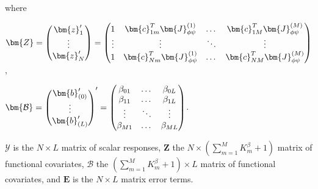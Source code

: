 where
\begin{center}
$ \bm{Z}=\def\arraystretch{1} \begin{pmatrix}
\bm{z}'_1 \\
\vdots\\
\bm{z}'_N
\end{pmatrix} = \def\arraystretch{1}
\begin{pmatrix}
1 & \bm{c}_{1 m}^T \bm{J}_{\phi \psi}^{(1)} & \dots & \bm{c}_{1 M}^T \bm{J}_{\phi \psi}^{(M)} \\
\vdots & \vdots & \ddots & \vdots \\
1 & \bm{c}_{N m}^T \bm{J}_{\phi \psi}^{(1)} & \dots & \bm{c}_{N M}^T \bm{J}_{\phi \psi}^{(M)}  
\end{pmatrix}$,
\end{center}

\begin{center}
$ \bm{\mathcal{B}}=\def\arraystretch{1} \begin{pmatrix}
\bm{b}'_{(0)} \\
\vdots\\
\bm{b}'_{(L)}
\end{pmatrix}' = \def\arraystretch{1}
\begin{pmatrix}
\beta_{01} & \dots & \beta_{0 L} \\
\beta_{11} & \dots & \beta_{1 L} \\
\vdots & \ddots & \vdots \\
\beta_{M1} & \dots & \beta_{M L}
\end{pmatrix}$.
\end{center} 
$\bm{\mathcal{Y}}$ is the $N \times L$ matrix of scalar responses, $\bm{Z}$ the $N \times \left(\sum_{m=1}^{M} K_m^{\beta} +1 \right)$ matrix of functional covariates, $\bm{\mathcal{B}}$ the $\left(\sum_{m=1}^{M} K_m^{\beta} + 1 \right) \times L$ matrix of functional covariates, and $\bm{E}$ is the $N \times L$ matrix error terms.


